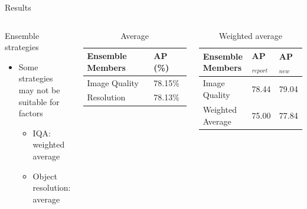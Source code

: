 \begin{frame}{Results}{}
\begin{columns}
    \begin{block}{Ensemble strategies}
    \begin{itemize}
        \item Some strategies may not be suitable for factors
        \begin{itemize}
            \item IQA: weighted average
            \item Object resolution: average
        \end{itemize}    
    \end{itemize}  
    

\end{block} 
    \begin{table}[h]
    \centering
    \caption{Average}
    \begin{tabular}{|l|l|}
    \hline
    \textbf{Ensemble Members}        & \textbf{AP (\%)} \\ \hline
    Image Quality & 78.15\% \\ \hline
    Resolution    & 78.13\% \\ \hline
    \end{tabular}
    \end{table}

    \begin{table}[]
    \centering
    \caption{Weighted average}
    \begin{tabular}{|l|l|l|}
    \hline
     \textbf{Ensemble Members} &  \textbf{AP$_{report}$} & \textbf{AP$_{new}$} \\ \hline
    Image Quality                                              & 78.44     & 79.04  \\ \hline
    Weighted Average                                           & 75.00     & 77.84  \\ \hline
    \end{tabular}
    \end{table}

\end{columns}
\end{frame}



